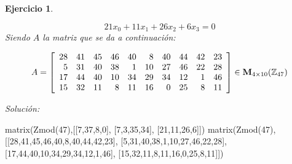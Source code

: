 \documentclass[12pt]{amsart}
\newtheorem{ejer}{Ejercicio}
\begin{document}
\begin{ejer}
\begin{minipage}{\textwidth}
\begin{tcolorbox}[colback = red!20!white,title=Versión Ecuaciones Implícitas]
\[ 21 x_{0} + 11 x_{1} + 26 x_{2} + 6 x_{3} = 0 \]
Siendo $A$ la matriz que se da a continuación:
\end{tcolorbox}
\end{minipage}
\[ A = \left[\begin{array}{rrrrrrrrrr}
28 & 41 & 45 & 46 & 40 & 8 & 40 & 44 & 42 & 23 \\
5 & 31 & 40 & 38 & 1 & 10 & 27 & 46 & 22 & 28 \\
17 & 44 & 40 & 10 & 34 & 29 & 34 & 12 & 1 & 46 \\
15 & 32 & 11 & 8 & 11 & 16 & 0 & 25 & 8 & 11
\end{array}\right] \in {\bf M}_{4\times 10}({\mathbb Z}_{47})\]
\end{ejer}

{\it Soluci\'on:}

\begin{sageblock}
matrix(Zmod(47),[[7,37,8,0],
[7,3,35,34],
[21,11,26,6]])
matrix(Zmod(47),[[28,41,45,46,40,8,40,44,42,23],
[5,31,40,38,1,10,27,46,22,28],
[17,44,40,10,34,29,34,12,1,46],
[15,32,11,8,11,16,0,25,8,11]])
\end{sageblock}

\end{document}
